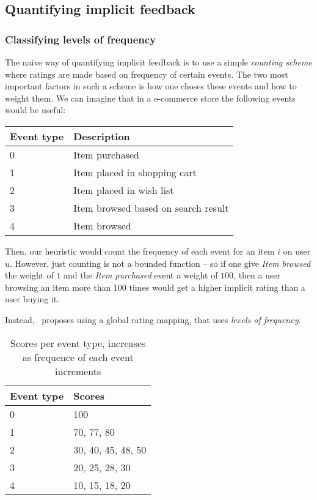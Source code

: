 \clearpage

\subsection{Quantifying implicit feedback}

\subsubsection{Classifying levels of frequency}

The naive way of quantifying implicit feedback is to use a simple
\textit{counting scheme} where ratings are made based on frequency of certain
events. The two most important factors in such a scheme is how one choses these
events and how to weight them. We can imagine that in a e-commerce store the
following events would be useful:

\begin{table}[H]
  \centering
  \begin{tabular}{ll}
  \toprule
  Event type & Description \\ \midrule
  0 & Item purchased \\
  1 & Item placed in shopping cart \\
  2 & Item placed in wish list \\
  3 & Item browsed based on search result \\
  4 & Item browsed \\
  \bottomrule
  \end{tabular}
\end{table}

Then, our heuristic would count the frequency of each event for an item $i$ on
user $u$. However, just counting is not a bounded function – so if one give
\textit{Item browsed} the weight of $1$ and the \textit{Item purchased} event
a weight of $100$, then a user browsing an item more than 100 times would get a
higher implicit rating than a user buying it.

Instead,~\cite{pkghost2014implicit} proposes using a global rating mapping,
that uses \textit{levels of frequency}.

\begin{table}[H]
  \centering
  \begin{tabular}{ll}
  \toprule
  Event type & Scores \\ \midrule
  0 & 100 \\
  1 & 70, 77, 80 \\
  2 & 30, 40, 45, 48, 50 \\
  3 & 20, 25, 28, 30 \\
  4 & 10, 15, 18, 20 \\
  \bottomrule
  \end{tabular}
  \caption{Scores per event type, increases as frequence of each event
           increments}
\label{implicit-table}
\end{table}

